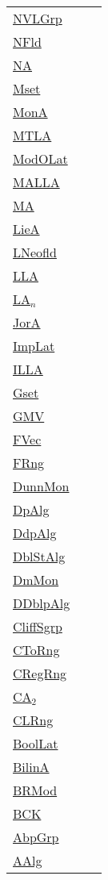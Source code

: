 {\begin{tabular}{|l|l|l|}
\hyperlink{NVLGrp}{NVLGrp}& &\\
\hyperlink{NFld}{NFld}& &\\
\hyperlink{NA}{NA}& &\\
\hyperlink{Mset}{Mset}& &\\
\hyperlink{MonA}{MonA}& &\\
\hyperlink{MTLA}{MTLA}& &\\
\hyperlink{ModOLat}{ModOLat}& &\\
\hyperlink{MALLA}{MALLA}& &\\
\hyperlink{MA}{MA}& &\\
\hyperlink{LieA}{LieA}& &\\
\hyperlink{LNeofld}{LNeofld}& &\\
\hyperlink{LLA}{LLA}& &\\
\hyperlink{LA$_n$}{LA$_n$}& &\\
\hyperlink{JorA}{JorA}& &\\
\hyperlink{ImpLat}{ImpLat}& &\\
\hyperlink{ILLA}{ILLA}& &\\
\hyperlink{Gset}{Gset}& &\\
\hyperlink{GMV}{GMV}& &\\
\hyperlink{FVec}{FVec}& &\\
\hyperlink{FRng}{FRng}& &\\
\hyperlink{DunnMon}{DunnMon}& &\\
\hyperlink{DpAlg}{DpAlg}& &\\
\hyperlink{DdpAlg}{DdpAlg}& &\\
\hyperlink{DblStAlg}{DblStAlg}& &\\
\hyperlink{DmMon}{DmMon}& &\\
\hyperlink{DDblpAlg}{DDblpAlg}& &\\
\hyperlink{CliffSgrp}{CliffSgrp}& &\\
\hyperlink{CToRng}{CToRng}& &\\
\hyperlink{CRegRng}{CRegRng}& &\\
\hyperlink{CA$_2$}{CA$_2$}& &\\
\hyperlink{CLRng}{CLRng}& &\\
\hyperlink{BoolLat}{BoolLat}& &\\
\hyperlink{BilinA}{BilinA}& &\\
\hyperlink{BRMod}{BRMod}& &\\
\hyperlink{BCK}{BCK}& &\\
\hyperlink{AbpGrp}{AbpGrp}& &\\
\hyperlink{AAlg}{AAlg}& \\\hline
\end{tabular}
}

\onecolumn
